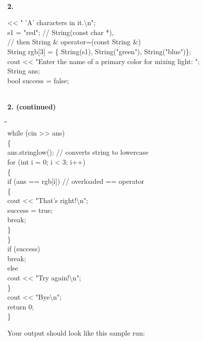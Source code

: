 \documentclass[10 pt]{amsart}
\newlength{\cwidth}
\newenvironment{cpart}[2][\cwidth]
	{%
		\\ %
		\textbf{#2. }%
		\begin{minipage}[t]{#1}%
		\setlength{\parindent}{0pt}%
		\setlength{\parskip}{2ex}%
	}
	{%
		\end{minipage}%
	}
\newenvironment{cpartContinued}[2][\cwidth]
	{%
		\\ %
		\textbf{#2. (continued)}%
		\\
		\phantom{#2. }
		\begin{minipage}[t]{#1}%
		\setlength{\parindent}{0pt}%
		\setlength{\parskip}{2ex}%
	}
	{%
		\end{minipage}%
	}
\newcommand{\tbs}{\textbackslash}
\begin{document}
\begin{cpart}{2}
{\begin{tabbing}
				\phantom{cout} << " 'A' characters in it.\tbs n"; \\
				s1 = "red"; \> \> \> // String(const char *), \\
				\> \> \> // then String & operator=(const String &) \\
				String rgb[3] = \{ String(s1), 
					String("green"), String("blue")\}; \\
				cout << "Enter the name of a primary color for 
							mixing light: "; \\
				String ans; \\
				bool success = false; \\
			\end{tabbing}
		}
		\end{cpart}
		\newpage

		\begin{cpartContinued}{2}
		{\ttfamily 
			\begin{tabbing}
				\phantom{\qquad}\=\phantom{\qquad}\=\phantom{\qquad}\=
				\hspace{1cm}\=\hspace{3cm}\= 
				\+ \\
				while (cin >> ans) \\
				\{ 
				\+ \\
				ans.stringlow(); \> \> \> // converts string to lowercase \\
				for (int i = 0; i < 3; i++) \\
				\{
				\+ \\
				if (ans == rgb[i]) \> \> // overloaded == operator \\
				\{
				\+ \\
				cout << "That's right!\tbs n"; \\
				success = true; \\
				break; \\
				\} 
				\- \\
				\} \\
				if (success) \\
				\> 	break; \\
				else \\
				\> 	cout << "Try again!\tbs n";
				\- \\
				\} \\
				cout << "Bye\tbs n"; \\
				return 0;
				\- \\
				\}
			\end{tabbing}
		}
		Your output should look like this sample run:


\end{cpartContinued}
\end{document}
